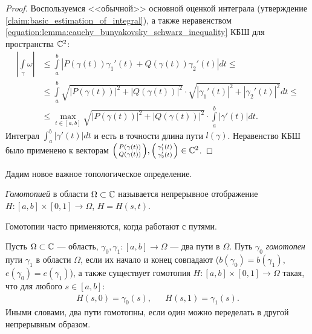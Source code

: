 \begin{proof}
 Воспользуемся <<обычной>> основной оценкой интеграла (утверждение \ref{claim:basic_estimation_of_integral}), а также неравенством \eqref{equation:lemma:cauchy_bunyakovsky_schwarz_inequality} КБШ для пространства $\mathbb{C}^{2}$:
 \begin{align*}
  \left| \int\limits_{\gamma} \omega  \right| &\leqslant \int\limits_{a}^{b} \left| P(\gamma(t))\gamma_1'(t) + Q(\gamma(t))\gamma_2'(t) \right|dt \leqslant \\
  &\leqslant \int\limits_{a}^{b} \sqrt{\left| P(\gamma(t)) \right|^{2} + \left| Q(\gamma(t)) \right|^{2}} \cdot \sqrt{\left| \gamma_1'(t) \right|^{2} + \left| \gamma_2'(t) \right|^{2}} dt \leqslant \\
  &\leqslant \max_{t \in [a,b]} \sqrt{\left| P(\gamma(t)) \right|^{2} + \left| Q(\gamma(t)) \right|^{2}} \cdot \int\limits_{a}^{b} \left| \gamma'(t) \right|  dt
  .\end{align*} Интеграл $\int_{a}^{b} \left| \gamma'(t) \right|dt$ и есть в точности длина пути $l(\gamma)$. Неравенство КБШ было применено к векторам $ \begin{psmallmatrix}
  P(\gamma(t)) \\ Q(\gamma(t))
  \end{psmallmatrix}, \begin{psmallmatrix}
  \gamma_1'(t) \\ \gamma_2'(t)
 \end{psmallmatrix} \in \mathbb{C}^{2}$.
\end{proof}

Дадим новое важное топологическое определение.
\begin{df}[гомотопия]
 \textit{Гомотопией} в области $\Omega \subset \mathbb{C}$ называется непрерывное отображение $H \colon [a,b] \times [0,1] \to \Omega$, $H = H(s,t)$. 
\end{df}

Гомотопии часто применяются, когда работают с путями.

\begin{df}
 \label{definition:path-homotopy}
 Пусть $\Omega \subset \mathbb{C}$ --- область, $\gamma_0, \gamma_1\colon [a,b] \to \Omega$ --- два пути в $\Omega$. Путь $\gamma_0$ \textit{гомотопен} пути $\gamma_1$ в области $\Omega$, если их начало и конец совпадают ($b(\gamma_0) = b(\gamma_1)$, $e(\gamma_0) = e(\gamma_1)$), а также существует гомотопия $H \colon [a,b] \times [0,1] \to \Omega$  такая, что для любого $s \in [a,b]$:
 \begin{align*}
  H(s,0) = \gamma_0(s), & &H(s,1) = \gamma_1(s).
 \end{align*} Иными словами, два пути гомотопны, если один можно переделать в другой непрерывным образом.
\end{df}

